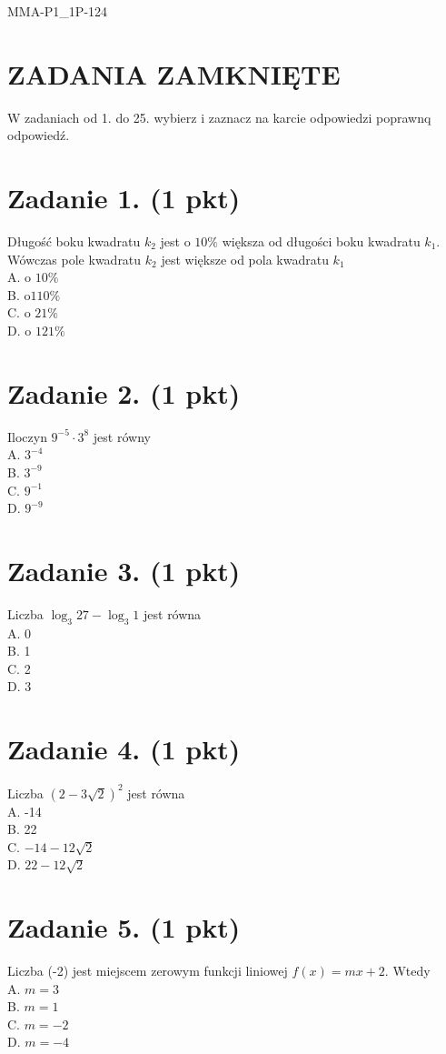 \documentclass[10pt]{article}
\begin{document}
MMA-P1\_1P-124

\section*{ZADANIA ZAMKNIĘTE}
W zadaniach od 1. do 25. wybierz i zaznacz na karcie odpowiedzi poprawnq odpowiedź.

\section*{Zadanie 1. (1 pkt)}
Długość boku kwadratu \(k_{2}\) jest o \(10 \%\) większa od długości boku kwadratu \(k_{1}\). Wówczas pole kwadratu \(k_{2}\) jest większe od pola kwadratu \(k_{1}\)\\
A. o \(10 \%\)\\
B. \(\mathrm{o} 110 \%\)\\
C. o \(21 \%\)\\
D. o \(121 \%\)

\section*{Zadanie 2. (1 pkt)}
Iloczyn \(9^{-5} \cdot 3^{8}\) jest równy\\
A. \(3^{-4}\)\\
B. \(3^{-9}\)\\
C. \(9^{-1}\)\\
D. \(9^{-9}\)

\section*{Zadanie 3. (1 pkt)}
Liczba \(\log _{3} 27-\log _{3} 1\) jest równa\\
A. 0\\
B. 1\\
C. 2\\
D. 3

\section*{Zadanie 4. (1 pkt)}
Liczba \((2-3 \sqrt{2})^{2}\) jest równa\\
A. -14\\
B. 22\\
C. \(-14-12 \sqrt{2}\)\\
D. \(22-12 \sqrt{2}\)

\section*{Zadanie 5. (1 pkt)}
Liczba (-2) jest miejscem zerowym funkcji liniowej \(f(x)=m x+2\). Wtedy\\
A. \(m=3\)\\
B. \(m=1\)\\
C. \(m=-2\)\\
D. \(m=-4\)
\end{document}
